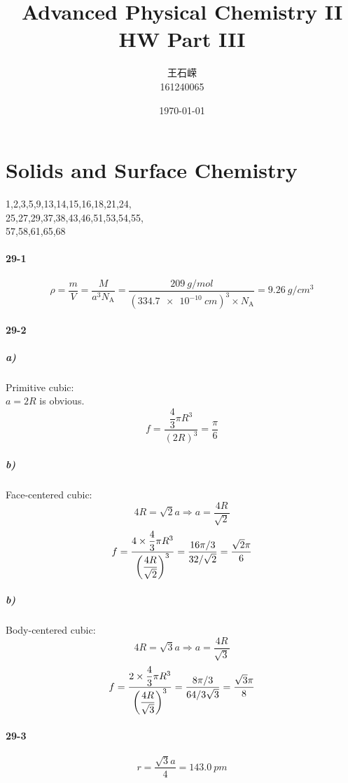 \documentclass[a4paper]{article}
\title{\textbf{Advanced Physical Chemistry II}\\HW   Part III}
\author{王石嵘
\vspace{5pt}\\
161240065\\
}
\date{\today} %
\newcommand{\NA}{N_\mathrm{A}}
\DeclareMathOperator{\dra}{\Rightarrow}
\newcommand{\ex}[1]{\paragraph{29-#1}}
\newcommand{\subex}[1]{\subparagraph{#1}}
\numberwithin{equation}{section}
\begin{document}

\maketitle



\setcounter{section}{28}
\section{Solids and Surface Chemistry}
1,2,3,5,9,13,14,15,16,18,21,24,\\
25,27,29,37,38,43,46,51,53,54,55,\\
57,58,61,65,68\\

\ex{1}
\begin{equation}\label{key}
\rho = \dfrac{m}{V} = \dfrac{M}{a^3\NA} = \dfrac{\SI{209}{g/mol}}{(\SI{334.7e-10}{cm})^3\times \NA} = \SI{9.26}{g/cm^3}
\end{equation}

\ex{2}
\subex{a)} Primitive cubic:\\
$ a=2R $ is obvious.
\begin{equation}\label{key}
f = \dfrac{\dfrac{4}{3}\pi R^3}{(2R)^3} = \dfrac{\pi}{6}
\end{equation}
\subex{b)} Face-centered cubic:\\
\begin{equation}\label{key}
4R = \sqrt{2}a \dra a = \dfrac{4R}{\sqrt{2}}
\end{equation}
\begin{equation}\label{key}
f = \dfrac{4\times \dfrac{4}{3}\pi R^3}{\qty(\dfrac{4R}{\sqrt{2}})^3} = \dfrac{16\pi/3}{32/\sqrt{2}} = \dfrac{\sqrt{2}\pi}{6}
\end{equation}
\subex{b)} Body-centered cubic:\\
\begin{equation}\label{key}
4R = \sqrt{3}a \dra a = \dfrac{4R}{\sqrt{3}}
\end{equation}
\begin{equation}\label{key}
f = \dfrac{2\times \dfrac{4}{3}\pi R^3}{\qty(\dfrac{4R}{\sqrt{3}})^3} = \dfrac{8\pi/3}{64/3\sqrt{3}} = \dfrac{\sqrt{3}\pi}{8}
\end{equation}

\ex{3}
\begin{equation}\label{key}
r = \dfrac{\sqrt{3}a}{4} = \SI{143.0}{pm}
\end{equation}
\end{document}
